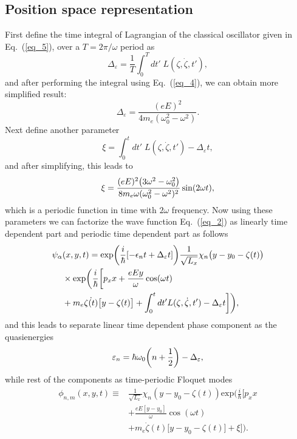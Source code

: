 \subsection{Position space representation}

First define the time integral of Lagrangian of the classical oscillator given in Eq.~(\ref{eq_5}), over a $T=2\pi/\omega$ period as
\begin{equation} \label{eq_b1}
  \Delta_{\varepsilon} = \frac{1}{T} \int_0^T dt' \; L(\zeta,\dot{\zeta},t'),
\end{equation}
and after performing the integral using Eq.~(\ref{eq_4}), we can obtain more simplified result:
\begin{equation} \label{eq_b2}
  \Delta_{\varepsilon} = \frac{(eE)^2}{4m_e(\omega_0^2 - \omega^2)}.
\end{equation}
Next define another parameter
\begin{equation} \label{eq_b3}
  \xi =
  \int_0^t dt' \; L(\zeta,\dot{\zeta},t') -
  \Delta_{\varepsilon} t,
\end{equation}
and after simplifying, this leads to
\begin{equation} \label{eq_b4}
  \xi =
  \frac{(eE)^2\qty(3\omega^2 - \omega_0^2)}{8m_e\omega(\omega_0^2 - \omega^2)^2} \sin(2\omega t),
\end{equation}
which is a periodic function in time with $2\omega$ frequency. Now using these  parameters we can factorize the wave function Eq.~(\ref{eq_2}) as linearly time dependent part and periodic time dependent part as follows
\begin{equation} \label{eq_b5}
  \begin{aligned}
    \psi_{\alpha}&(x,y,t)  =
    \exp(\frac{i}{\hbar}\qty[-\epsilon_nt + \Delta_{\varepsilon} t ])
    \frac{1}{\sqrt{L_x}} \chi_n\big(y - y_0 - \zeta(t)\big)
    \\
    & \times
    \text{exp}\bigg(
     \frac{i}{\hbar}\bigg[
     p_x x +
     \frac{eEy}{\omega}\cos(\omega t) \\
     & +
     m_e\dot{\zeta(t)}\big[y-\zeta(t)\big]
     + \int_0^{t}dt'L(\zeta,\dot{\zeta},t') - \Delta_{\varepsilon} t  \bigg]
     \bigg),
  \end{aligned}
\end{equation}
and this leads to separate linear time dependent phase component as the quasienergies
\begin{equation} \label{eq_b6}
  \varepsilon_{n} =
  \hbar \omega_0\qty(n + \frac{1}{2}) - \Delta_{\varepsilon},
\end{equation}
while rest of the components as time-periodic Floquet modes
\begin{equation} \label{eq_b7}
  \begin{aligned}
    \phi_{n,m}(x,y,t) \equiv &
    \frac{1}{\sqrt{L_x}} \chi_{n}\left(y - y_0 - \zeta(t)\right)
    \text{exp}\bigg(
     \frac{i}{\hbar}\bigg[
     p_x x \\
     & +
     \frac{eE[y - y_0]}{\omega}\cos(\omega t) \\
     & +
     m_e\dot{\zeta}(t)\big[y - y_0 -\zeta(t)\big]
     + \xi \bigg]\bigg).
  \end{aligned}
\end{equation}

